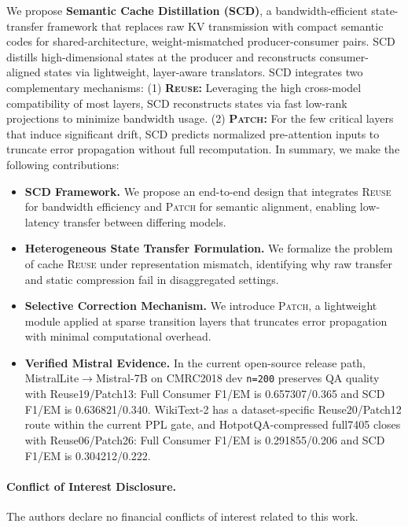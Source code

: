 \documentclass{article}
\theoremstyle{plain}
\theoremstyle{definition}
\theoremstyle{remark}
\begin{document}
We propose \textbf{Semantic Cache Distillation (SCD)}, a bandwidth-efficient state-transfer framework that replaces raw KV transmission with compact semantic codes for shared-architecture, weight-mismatched producer-consumer pairs. SCD distills high-dimensional states at the producer and reconstructs consumer-aligned states via lightweight, layer-aware translators. SCD integrates two complementary mechanisms: (1) \textbf{\textsc{Reuse}:} Leveraging the high cross-model compatibility of most layers, SCD reconstructs states via fast low-rank projections to minimize bandwidth usage. (2) \textbf{\textsc{Patch}:} For the few critical layers that induce significant drift, SCD predicts normalized pre-attention inputs to truncate error propagation without full recomputation. In summary, we make the following contributions:
\begin{itemize} 
    \item \textbf{SCD Framework.} We propose an end-to-end design that integrates \textsc{Reuse} for bandwidth efficiency and \textsc{Patch} for semantic alignment, enabling low-latency transfer between differing models. 
    \item \textbf{Heterogeneous State Transfer Formulation.} We formalize the problem of cache \textsc{Reuse} under representation mismatch, identifying why raw transfer and static compression fail in disaggregated settings. 
    \item \textbf{Selective Correction Mechanism.} We introduce \textsc{Patch}, a lightweight module applied at sparse transition layers that truncates error propagation with minimal computational overhead. 
    \item \textbf{Verified Mistral Evidence.} In the current open-source release path, MistralLite$\to$Mistral-7B on CMRC2018 dev \texttt{n=200} preserves QA quality with Reuse19/Patch13: Full Consumer F1/EM is 0.657307/0.365 and SCD F1/EM is 0.636821/0.340. WikiText-2 has a dataset-specific Reuse20/Patch12 route within the current PPL gate, and HotpotQA-compressed full7405 closes with Reuse06/Patch26: Full Consumer F1/EM is 0.291855/0.206 and SCD F1/EM is 0.304212/0.222.
\end{itemize}

\paragraph{Conflict of Interest Disclosure.}
The authors declare no financial conflicts of interest related to this work.
\end{document}
